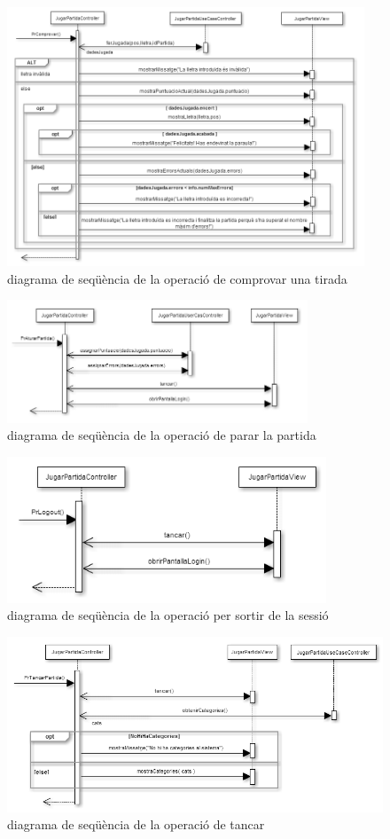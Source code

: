     \begin{figure}[h]
    \centering
    \includegraphics[width=0.95\textwidth]{images/prComprovar.png}
    \caption{diagrama de seqüència de la operació de comprovar una tirada}
    \end{figure}
    
    \begin{figure}[h]
    \centering
    \includegraphics[width=0.8\textwidth]{images/prAturarPartida.png}
    \caption{diagrama de seqüència de la operació de parar la partida}
    \end{figure}
    
    \begin{figure}[h]
    \centering
    \includegraphics[width=0.85\textwidth]{images/prLogout.png}
    \caption{diagrama de seqüència de la operació per sortir de la sessió}
    \end{figure}
    
    \begin{figure}[h]
    \centering
    \includegraphics[width=1.0\textwidth]{images/prTancar.png}
    \caption{diagrama de seqüència de la operació de tancar}
    \end{figure}